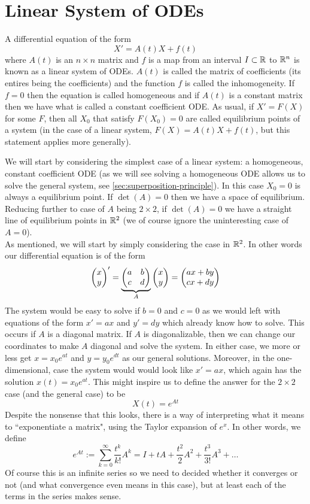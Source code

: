 \section{Linear System of ODEs}

A differential equation of the form
$$ X' = A(t) X + f(t) $$
where $A(t)$ is an $n \times n$ matrix and $f$ is a map from an interval $I \subset \mathbb{R}$ to $\mathbb{R}^n$ is known as a linear system of ODEs. $A(t)$ is called the matrix of coefficients (its entires being the coefficients) and the function $f$ is called the inhomogeneity. If $f = 0$ then the equation is called homogeneous and if $A(t)$ is a constant matrix then we have what is called a constant coefficient ODE. As usual, if $X' = F(X)$ for some $F$, then all $X_0$ that satisfy $F(X_0) = 0$ are called equilibrium points of a system (in the case of a linear system, $F(X) = A(t) X + f(t)$, but this statement applies more generally). 

We will start by considering the simplest case of a linear system: a homogeneous, constant coefficient ODE (as we will see solving a homogeneous ODE allows us to solve the general system, see \autoref{sec:superposition-principle}). In this case $X_0 = 0$ is always a equilibrium point. If $\det(A) = 0$ then we have a space of equilibrium. Reducing further to case of $A$ being $2 \times 2$, if $\det(A) = 0$ we have a straight line of equilibrium points in $\mathbb{R}^2$ (we of course ignore the uninteresting case of $A = 0$).\\

As mentioned, we will start by simply considering the case in $\mathbb{R}^2$. In other words our differential equation is of the form
\begin{equation}\label{eq:hom-lin-eqn}
    \begin{pmatrix} x \\ y \end{pmatrix}' = \underbrace{\begin{pmatrix} a & b\\c & d \end{pmatrix}}_{A} \begin{pmatrix} x \\ y \end{pmatrix} = \begin{pmatrix} ax + by \\ cx + dy \end{pmatrix}
\end{equation}
The system would be easy to solve if $b = 0$ and $c = 0$ as we would left with equations of the form $x' = ax$ and $y' = dy$ which already know how to solve. This occurs if $A$ is a diagonal matrix. If $A$ is diagonalizable, then we can change our coordinates to make $A$ diagonal and solve the system. In either case, we more or less get $x = x_0 e^{at}$ and $y = y_0 e^{dt}$ as our general solutions. Moreover, in the one-dimensional, case the system would would look like $x' = ax$, which again has the solution $x(t) = x_0 e^{at}$. This might inspire us to define the answer for the $2 \times 2$ case (and the general case) to be
$$ X(t) = e^{At} $$
Despite the nonsense that this looks, there is a way of interpreting what it means to ``exponentiate a matrix", using the Taylor expansion of $e^x$. In other words, we define
$$ e^{At} := \sum_{k = 0}^{\infty} \frac{t^k}{k!} A^k = I + tA + \frac{t^2}{2}A^2 + \frac{t^3}{3!} A^3 + \dots $$
Of course this is an infinite series so we need to decided whether it converges or not (and what convergence even means in this case), but at least each of the terms in the series makes sense.


